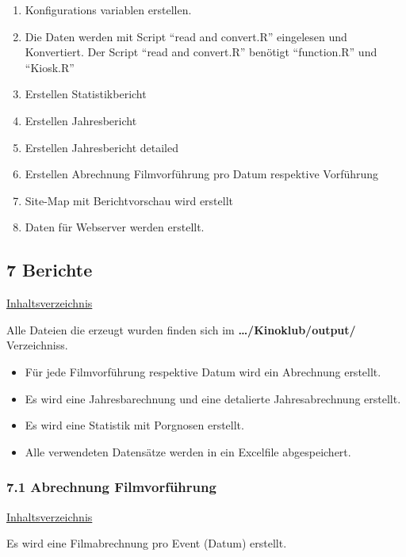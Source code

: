 \documentclass[
]{article}
\providecommand{\tightlist}{%
  \setlength{\itemsep}{0pt}\setlength{\parskip}{0pt}}
\begin{document}
\begin{enumerate}
\def\labelenumi{\arabic{enumi}.}
\tightlist
\item
  Konfigurations variablen erstellen.
\item
  Die Daten werden mit Script ``read and convert.R'' eingelesen und
  Konvertiert. Der Script ``read and convert.R'' benötigt ``function.R''
  und ``Kiosk.R''
\item
  Erstellen Statistikbericht
\item
  Erstellen Jahresbericht
\item
  Erstellen Jahresbericht detailed
\item
  Erstellen Abrechnung Filmvorführung pro Datum respektive Vorführung
\item
  Site-Map mit Berichtvorschau wird erstellt
\item
  Daten für Webserver werden erstellt.
\end{enumerate}

\newpage

\subsection{7 Berichte}\label{berichte}

\hyperref[Inhaltsverzeichnis]{Inhaltsverzeichnis}

Alle Dateien die erzeugt wurden finden sich im
\textbf{\ldots/Kinoklub/output/} Verzeichniss.

\begin{itemize}
\tightlist
\item
  Für jede Filmvorführung respektive Datum wird ein Abrechnung erstellt.
\item
  Es wird eine Jahresbarechnung und eine detalierte Jahresabrechnung
  erstellt.
\item
  Es wird eine Statistik mit Porgnosen erstellt.
\item
  Alle verwendeten Datensätze werden in ein Excelfile abgespeichert.
\end{itemize}

\subsubsection{7.1 Abrechnung
Filmvorführung}\label{abrechnung-filmvorfuxfchrung}

\hyperref[Inhaltsverzeichnis]{Inhaltsverzeichnis}

Es wird eine Filmabrechnung pro Event (Datum) erstellt.
\end{document}
